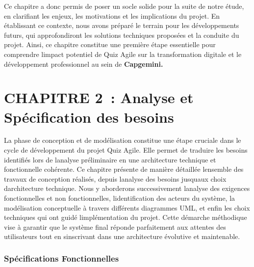 \documentclass[12pt,a4paper,twoside]{report}
\begin{document}
Ce chapitre a donc permis de poser un socle solide pour la suite de
notre étude, en clarifiant les enjeux, les motivations et les
implications du projet. En établissant ce contexte, nous avons préparé
le terrain pour les développements futurs, qui approfondiront les
solutions techniques proposées et la conduite du projet. Ainsi, ce
chapitre constitue une première étape essentielle pour comprendre
l\textquotesingle impact potentiel de Quiz Agile sur la transformation
digitale et le développement professionnel au sein de
\textbf{Capgemini.}

\hypertarget{section-2}{%
\section{}\label{section-2}}

\hypertarget{chapitre-2-analyse-et-spuxe9cification-des-besoins}{%
\section{CHAPITRE 2~: Analyse et Spécification des
besoins}\label{chapitre-2-analyse-et-spuxe9cification-des-besoins}}

La phase de conception et de modélisation constitue une étape cruciale
dans le cycle de développement du projet Quiz Agile. Elle permet de
traduire les besoins identifiés lors de l\textquotesingle analyse
préliminaire en une architecture technique et fonctionnelle cohérente.
Ce chapitre présente de manière détaillée l\textquotesingle ensemble des
travaux de conception réalisés, depuis l\textquotesingle analyse des
besoins jusqu\textquotesingle aux choix d\textquotesingle architecture
technique. Nous y aborderons successivement l\textquotesingle analyse
des exigences fonctionnelles et non fonctionnelles,
l\textquotesingle identification des acteurs du système, la modélisation
conceptuelle à travers différents diagrammes UML, et enfin les choix
techniques qui ont guidé l\textquotesingle implémentation du projet.
Cette démarche méthodique vise à garantir que le système final réponde
parfaitement aux attentes des utilisateurs tout en
s\textquotesingle inscrivant dans une architecture évolutive et
maintenable.

\hypertarget{spuxe9cifications-fonctionnelles}{%
\subsubsection{Spécifications
Fonctionnelles}\label{spuxe9cifications-fonctionnelles}}
\end{document}
